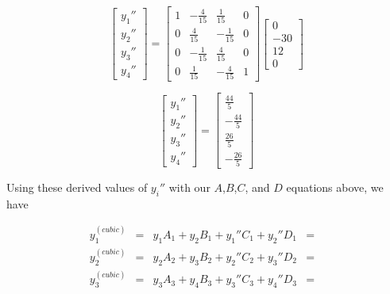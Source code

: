 \documentclass[11pt]{article} %
\begin{document}
$$
\begin{bmatrix} y_1'' \\ y_2'' \\ y_3'' \\ y_4'' \end{bmatrix} = 
\begin{bmatrix} 1 & -\frac{4}{15} & \frac{1}{15} & 0 \\ 0 & \frac{4}{15} & -\frac{1}{15} & 0 
		 \\ 0 & -\frac{1}{15} & \frac{4}{15} & 0 \\ 0 & \frac{1}{15} & -\frac{4}{15} & 1
\end{bmatrix}
\begin{bmatrix} 0 \\ -30 \\ 12 \\ 0\end{bmatrix}$$

$$
\begin{bmatrix} y_1'' \\ y_2'' \\ y_3'' \\ y_4'' \end{bmatrix} = 
\begin{bmatrix} \frac{44}{5} \\ -\frac{44}{5} \\ \frac{26}{5} \\ -\frac{26}{5}\end{bmatrix}$$

Using these derived values of $y_i''$ with our $A$,$B$,$C$, and $D$ equations above, we have

$$\begin{array}{lclcl} y^{(cubic)}_1 & = &  y_1A_1 + y_2B_1 + y_1''C_1 + y_2'' D_1 & = &  \\
		        y^{(cubic)}_2  & = & y_2A_2 + y_3B_2 + y_2''C_2 + y_3'' D_2 & = &  \\
		        y^{(cubic)}_3  & = & y_3A_3 + y_4B_3 + y_3''C_3 + y_4'' D_3 & = & 
\end{array}$$


\end{document}
